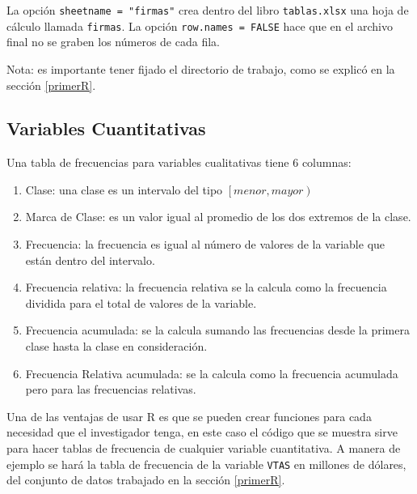 \documentclass[]{book}
\providecommand{\tightlist}{%
  \setlength{\itemsep}{0pt}\setlength{\parskip}{0pt}}
\begin{document}
La opción \texttt{sheetname\ =\ "firmas"} crea dentro del libro
\texttt{tablas.xlsx} una hoja de cálculo llamada \texttt{firmas}. La
opción \texttt{row.names\ =\ FALSE} hace que en el archivo final no se
graben los números de cada fila.

Nota: es importante tener fijado el directorio de trabajo, como se
explicó en la sección \ref{primerR}.

\subsection{Variables Cuantitativas}\label{variables-cuantitativas}

Una tabla de frecuencias para variables cualitativas tiene 6 columnas:

\begin{enumerate}
\def\labelenumi{\arabic{enumi}.}
\tightlist
\item
  Clase: una clase es un intervalo del tipo
  \(\left[ menor, mayor \right)\)
\item
  Marca de Clase: es un valor igual al promedio de los dos extremos de
  la clase.
\item
  Frecuencia: la frecuencia es igual al número de valores de la variable
  que están dentro del intervalo.
\item
  Frecuencia relativa: la frecuencia relativa se la calcula como la
  frecuencia dividida para el total de valores de la variable.
\item
  Frecuencia acumulada: se la calcula sumando las frecuencias desde la
  primera clase hasta la clase en consideración.
\item
  Frecuencia Relativa acumulada: se la calcula como la frecuencia
  acumulada pero para las frecuencias relativas.
\end{enumerate}

Una de las ventajas de usar R es que se pueden crear funciones para cada
necesidad que el investigador tenga, en este caso el código que se
muestra sirve para hacer tablas de frecuencia de cualquier variable
cuantitativa. A manera de ejemplo se hará la tabla de frecuencia de la
variable \texttt{VTAS} en millones de dólares, del conjunto de datos
trabajado en la sección \ref{primerR}.
\end{document}
